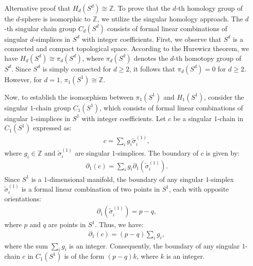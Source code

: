 \begin{example}
	Alternative proof that \( H_{d}(S^{d}) \cong \mathbb{Z} \). To prove that the \( d \)-th homology group of the \( d \)-sphere is isomorphic to \(\mathbb{Z}\), we utilize the singular homology approach. The \( d \)-th singular chain group \( C_{d}(S^{d}) \) consists of formal linear combinations of singular \( d \)-simplices in \( S^{d} \) with integer coefficients. First, we observe that \( S^{d} \) is a connected and compact topological space. According to the Hurewicz theorem, we have \( H_{d}(S^{d}) \cong \pi_{d}(S^{d}) \), where \( \pi_{d}(S^{d}) \) denotes the \( d \)-th homotopy group of \( S^{d} \). Since \( S^{d} \) is simply connected for \( d \geq 2 \), it follows that \( \pi_{d}(S^{d}) = 0 \) for \( d \geq 2 \). However, for \( d = 1 \), \( \pi_{1}(S^{1}) \cong \mathbb{Z} \).
			
	Now, to establish the isomorphism between \( \pi_{1}(S^{1}) \) and \( H_{1}(S^{1}) \), consider the singular \( 1 \)-chain group \( C_{1}(S^{1}) \), which consists of formal linear combinations of singular \( 1 \)-simplices in \( S^{1} \) with integer coefficients. Let \( c \) be a singular \( 1 \)-chain in \( C_{1}(S^{1}) \) expressed as:
	\begin{align}
		c = \sum_{i} g_{i} \tilde{\sigma}^{(1)}_{i}, 
	\end{align}
	where \( g_{i} \in \mathbb{Z} \) and \( \tilde{\sigma}^{(1)}_{i} \) are singular \( 1 \)-simplices. The boundary of \( c \) is given by:
	\begin{align}
		\partial_{1}(c) = \sum_{i} g_{i} \partial_{1}(\tilde{\sigma}^{(1)}_{i}). 
	\end{align}
	Since \( S^{1} \) is a \( 1 \)-dimensional manifold, the boundary of any singular \( 1 \)-simplex \( \tilde{\sigma}^{(1)}_{i} \) is a formal linear combination of two points in \( S^{1} \), each with opposite orientations:
	\begin{align}
		\partial_{1}(\tilde{\sigma}^{(1)}_{i}) = p - q, 
	\end{align}
	where \( p \) and \( q \) are points in \( S^{1} \). Thus, we have:
	\begin{align}
		\partial_{1}(c) = (p - q) \sum_{i} g_{i}, 
	\end{align}
	where the sum \( \sum_{i} g_{i} \) is an integer. Consequently, the boundary of any singular \( 1 \)-chain \( c \) in \( C_{1}(S^{1}) \) is of the form \( (p - q)k \), where \( k \) is an integer.
			

\end{example}
